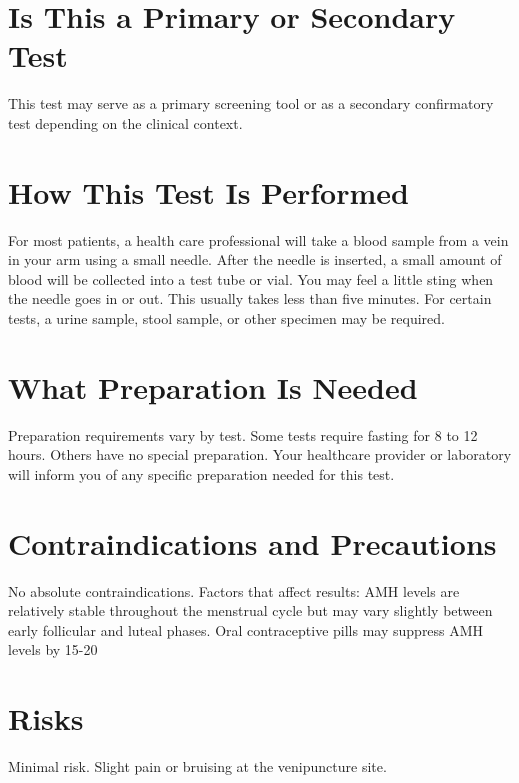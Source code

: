 \section*{Is This a Primary or Secondary Test}
This test may serve as a primary screening tool or as a secondary confirmatory test depending on the clinical context.

\section*{How This Test Is Performed}
For most patients, a health care professional will take a blood sample from a vein in your arm using a small needle. After the needle is inserted, a small amount of blood will be collected into a test tube or vial. You may feel a little sting when the needle goes in or out. This usually takes less than five minutes. For certain tests, a urine sample, stool sample, or other specimen may be required.

\section*{What Preparation Is Needed}
Preparation requirements vary by test. Some tests require fasting for 8 to 12 hours. Others have no special preparation. Your healthcare provider or laboratory will inform you of any specific preparation needed for this test.

\section*{Contraindications and Precautions}
No absolute contraindications. Factors that affect results: AMH levels are relatively stable throughout the menstrual cycle but may vary slightly between early follicular and luteal phases. Oral contraceptive pills may suppress AMH levels by 15-20%

\section*{Risks}
Minimal risk. Slight pain or bruising at the venipuncture site.

